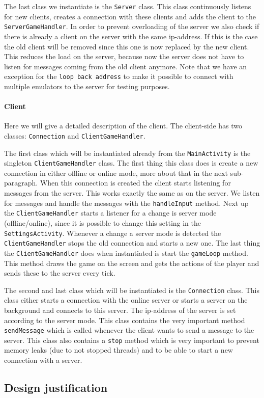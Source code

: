 \documentclass[../main.tex]{subfiles}
\begin{document}
        The last class we instantiate is the \texttt{Server} class. This class continuously listens for new clients, creates a connection with these clients and adds the client to the \texttt{ServerGameHandler}. In order to prevent overloading of the server we also check if there is already a client on the server with the same ip-address. If this is the case the old client will be removed since this one is now replaced by the new client. This reduces the load on the server, because now the server does not have to listen for messages coming from the old client anymore. Note that we have an exception for the \texttt{loop back address} to make it possible to connect with multiple emulators to the server for testing purposes.

        \paragraph{Client}
        Here we will give a detailed description of the client. The client-side has two classes: \texttt{Connection} and \texttt{ClientGameHandler}.

        The first class which will be instantiated already from the \texttt{MainActivity} is the singleton \texttt{ClientGameHandler} class. The first thing this class does is create a new connection in either offline or online mode, more about that in the next sub-paragraph. When this connection is created the client starts listening for messages from the server. This works exactly the same as on the server. We listen for messages and handle the messages with the \texttt{handleInput} method. Next up the \texttt{ClientGameHandler} starts a listener for a change is server mode (offline/online), since it is possible to change this setting in the \texttt{SettingsActivity}. Whenever a change a server mode is detected the \texttt{ClientGameHandler} stops the old connection and starts a new one. The last thing the \texttt{ClientGameHandler} does when instantiated is start the \texttt{gameLoop} method. This method draws the game on the screen and gets the actions of the player and sends these to the server every tick.

        The second and last class which will be instantiated is the \texttt{Connection} class. This class either starts a connection with the online server or starts a server on the background and connects to this server. The ip-address of the server is set according to the server mode. This class contains the very important method \texttt{sendMessage} which is called whenever the client wants to send a message to the server. This class also contains a \texttt{stop} method which is very important to prevent memory leaks (due to not stopped threads) and to be able to start a new connection with a server. 

    \subsection{Design justification}
\end{document}
